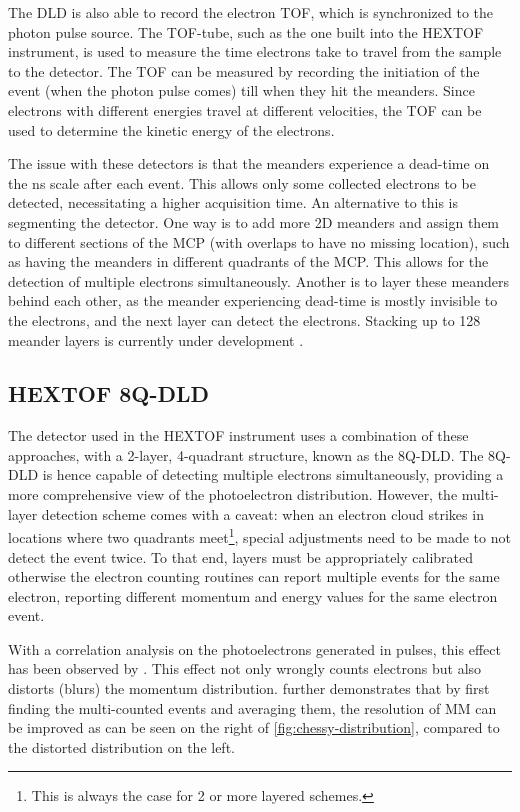 The \gls{DLD} is also able to record the electron \gls{TOF}, which is synchronized to the photon pulse source. The \gls{TOF}-tube, such as the one built into the \gls{HEXTOF} instrument, is used to measure the time electrons take to travel from the sample to the detector. The \gls{TOF} can be measured by recording the initiation of the event (when the photon pulse comes) till when they hit the meanders. Since electrons with different energies travel at different velocities, the \gls{TOF} can be used to determine the kinetic energy of the electrons.

The issue with these detectors is that the meanders experience a dead-time on the \unit{ns} scale after each event. This allows only some collected electrons to be detected, necessitating a higher acquisition time. An alternative to this is segmenting the detector. One way is to add more 2D meanders and assign them to different sections of the \gls{MCP} (with overlaps to have no missing location), such as having the meanders in different quadrants of the \gls{MCP}. This allows for the detection of multiple electrons simultaneously. Another is to layer these meanders behind each other, as the meander experiencing dead-time is mostly invisible to the electrons, and the next layer can detect the electrons. Stacking up to \num{128} meander layers is currently under development \cite{oelsnerTimeEnergyResolved2010}.

\subsection{HEXTOF 8Q-DLD}\label{section:8q-dld}
The detector used in the \gls{HEXTOF} instrument uses a combination of these approaches, with a 2-layer, 4-quadrant structure, known as the 8Q-DLD. The 8Q-DLD is hence capable of detecting multiple electrons simultaneously, providing a more comprehensive view of the photoelectron distribution. However, the multi-layer detection scheme comes with a caveat: when an electron cloud strikes in locations where two quadrants meet\footnote{This is always the case for 2 or more layered schemes.}, special adjustments need to be made to not detect the event twice. To that end, layers must be appropriately calibrated otherwise the electron counting routines can report multiple events for the same electron, reporting different momentum and energy values for the same electron event. 

With a correlation analysis on the photoelectrons generated in pulses, this effect has been observed by \citeauthor{heberStudiesUltrafastDynamics2024} \cite{heberStudiesUltrafastDynamics2024}. This effect not only wrongly counts electrons but also distorts (blurs) the momentum distribution. \citeauthor{heberStudiesUltrafastDynamics2024} further demonstrates that by first finding the multi-counted events and averaging them, the resolution of \gls{MM} can be improved as can be seen on the right of \cref{fig:chessy-distribution}, compared to the distorted distribution on the left.

